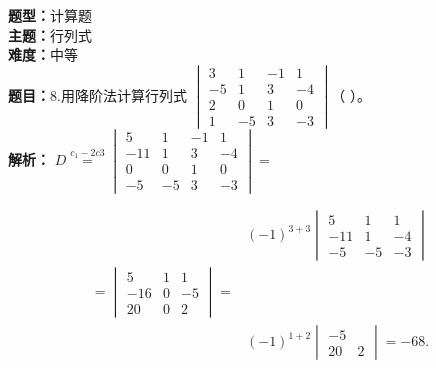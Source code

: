 \documentclass{ctexart}
\newenvironment{question}[5]{%
	\noindent\textbf{题型：}#1\\
	\textbf{主题：}#2\\
	\textbf{难度：}#3\\
	\textbf{题目：}#4\\
	\textbf{解析：}#5\\
	\vspace{1em}
}{}
\begin{document}
	\begin{question}
		{计算题}
		{行列式}
		{中等}
		{8.用降阶法计算行列式 $\begin{vmatrix}3 & 1 & -1 & 1 \\ -5 & 1 & 3 & -4 \\ 2 & 0 & 1 & 0 \\ 1 & -5 & 3 & -3\end{vmatrix}$（ ）。}
		{ $D \stackrel{c_1-2 c 3}{=}\begin{vmatrix}5 & 1 & -1 & 1 \\ -11 & 1 & 3 & -4 \\ 0 & 0 & 1 & 0 \\ -5 & -5 & 3 & -3\end{vmatrix}=$
			
			$$
			\begin{aligned}
				& (-1)^{3+3}\begin{vmatrix}
					5 & 1 & 1 \\
					-11 & 1 & -4 \\
					-5 & -5 & -3
				\end{vmatrix} \\
				=\begin{vmatrix}
					5 & 1 & 1 \\
					-16 & 0 & -5 \\
					20 & 0 & 2
				\end{vmatrix}= \\
				& (-1)^{1+2}\begin{vmatrix}
					-5 \\
					20 & 2
				\end{vmatrix}=-68 .
			\end{aligned}
			$$}
	\end{question}
	
\end{document}
